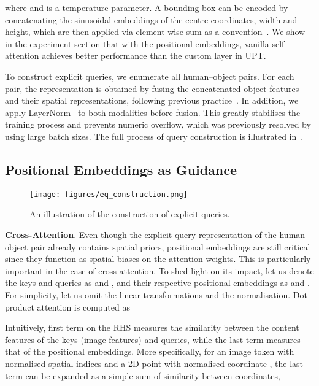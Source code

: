 \documentclass[10pt,twocolumn,letterpaper]{article}
\begin{document}
where  and  is a temperature parameter. A bounding box can be encoded by concatenating the sinusoidal embeddings of the centre coordinates, width and height, which are then applied via element-wise sum as a convention~\cite{xfmer, detr}. We show in the experiment section that with the positional embeddings, vanilla self-attention achieves better performance than the custom layer in UPT.

To construct explicit queries, we enumerate all human--object pairs. For each pair, the representation is obtained by fusing the concatenated object features and their spatial representations, following previous practice~\cite{scg, upt}. In addition, we apply LayerNorm~\cite{ln} to both modalities before fusion. This greatly stabilises the training process and prevents numeric overflow, which was previously resolved by using large batch sizes. The full process of query construction is illustrated in~.

\subsection{Positional Embeddings as Guidance}

\begin{figure}[t]
   \centering
   \texttt{[image: figures/eq\_construction.png]}
   \caption{An illustration of the construction of explicit queries.}
   \label{fig:eq-construction}
\end{figure}

\textbf{Cross-Attention}.
Even though the explicit query representation of the human--object pair already contains spatial priors, positional embeddings are still critical since they function as spatial biases on the attention weights. This is particularly important in the case of cross-attention. To shed light on its impact, let us denote the keys and queries as  and , and their respective positional embeddings as  and . For simplicity, let us omit the linear transformations and the normalisation. Dot-product attention is computed as

Intuitively, first term on the RHS measures the similarity between the content features of the keys (image features) and queries, while the last term measures that of the positional embeddings. More specifically, for an image token with normalised spatial indices  and a 2D point with normalised coordinate , the last term can be expanded as a simple sum of similarity between coordinates,
\end{document}
